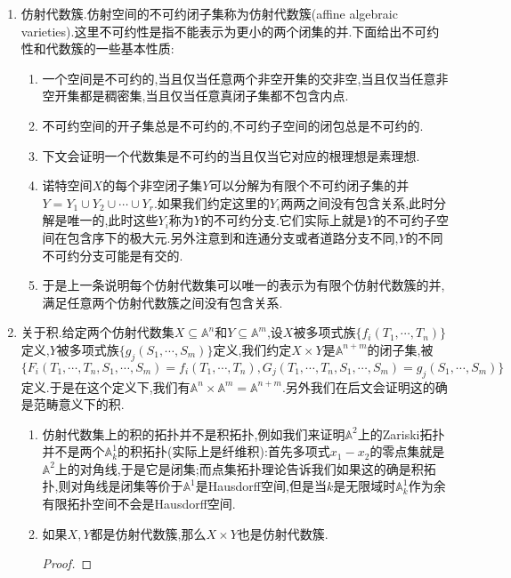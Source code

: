 \begin{enumerate}
\begin{enumerate}
\begin{proof}
    		假设存在闭集的降链$Y_1\supset Y_2\supset\cdots\supset$,这得到了$R=k[x_1,x_2,\cdots,x_n]$中的理想升链$I(Y_1)\subseteq I(Y_2)\subset\cdots$,按照$R$是诺特环说明这个理想链是终止的,再结合$Y_i=Z(I(Y_i))$说明闭集降链终止.注意这个证明并没有用到希尔伯特零点定理.
    	\end{proof}
    \end{enumerate}
    \item 仿射代数簇.仿射空间的不可约闭子集称为仿射代数簇(affine algebraic varieties).这里不可约性是指不能表示为更小的两个闭集的并.下面给出不可约性和代数簇的一些基本性质:
    \begin{enumerate}
    	\item 一个空间是不可约的,当且仅当任意两个非空开集的交非空,当且仅当任意非空开集都是稠密集,当且仅当任意真闭子集都不包含内点.
    	\item 不可约空间的开子集总是不可约的,不可约子空间的闭包总是不可约的.
    	\item 下文会证明一个代数集是不可约的当且仅当它对应的根理想是素理想.
    	\item 诺特空间$X$的每个非空闭子集$Y$可以分解为有限个不可约闭子集的并$Y=Y_1\cup Y_2\cup\cdots\cup Y_r$.如果我们约定这里的$Y_i$两两之间没有包含关系,此时分解是唯一的,此时这些$Y_i$称为$Y$的不可约分支.它们实际上就是$Y$的不可约子空间在包含序下的极大元.另外注意到和连通分支或者道路分支不同,$Y$的不同不可约分支可能是有交的.
    	\item 于是上一条说明每个仿射代数集可以唯一的表示为有限个仿射代数簇的并,满足任意两个仿射代数簇之间没有包含关系.
    \end{enumerate}
    \item 关于积.给定两个仿射代数集$X\subseteq\mathbb{A}^n$和$Y\subseteq\mathbb{A}^m$,设$X$被多项式族$\{f_i(T_1,\cdots,T_n)\}$定义,$Y$被多项式族$\{g_j(S_1,\cdots,S_m)\}$定义,我们约定$X\times Y$是$\mathbb{A}^{n+m}$的闭子集,被$\{F_i(T_1,\cdots,T_n,S_1,\cdots,S_m)=f_i(T_1,\cdots,T_n),G_j(T_1,\cdots,T_n,S_1,\cdots,S_m)=g_j(S_1,\cdots,S_m)\}$定义.于是在这个定义下,我们有$\mathbb{A}^n\times\mathbb{A}^m=\mathbb{A}^{n+m}$.另外我们在后文会证明这的确是范畴意义下的积.
    \begin{enumerate}
    	\item 仿射代数集上的积的拓扑并不是积拓扑,例如我们来证明$\mathbb{A}^2$上的Zariski拓扑并不是两个$\mathbb{A}_k^1$的积拓扑(实际上是纤维积):首先多项式$x_1-x_2$的零点集就是$\mathbb{A}^2$上的对角线,于是它是闭集;而点集拓扑理论告诉我们如果这的确是积拓扑,则对角线是闭集等价于$\mathbb{A}^1$是Hausdorff空间,但是当$k$是无限域时$\mathbb{A}_k^1$作为余有限拓扑空间不会是Hausdorff空间.
    	\item 如果$X,Y$都是仿射代数簇,那么$X\times Y$也是仿射代数簇.
    	\begin{proof}
    		

\end{proof}
\end{enumerate}
\end{enumerate}
